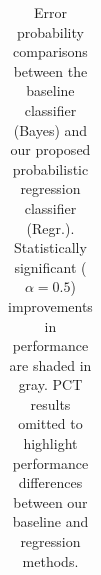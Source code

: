 \documentclass[12pt]{cmuthesis}
\begin{document}
\begin{table}[!htbp]
\begin{center}
\begin{tabular} {||c||c|c|c||c|c|c||c|c|c||}
\hline
\hline
\hline
\end{tabular}
\caption{Error probability comparisons between the baseline classifier (Bayes) and our proposed probabilistic regression classifier (Regr.). Statistically significant ($\alpha=0.5$) improvements in performance are shaded in gray. PCT results omitted to highlight performance differences between our baseline and regression methods.}
\label{tab:mcnemar-RWC}
\end{center}
\end{table}

\end{document}
